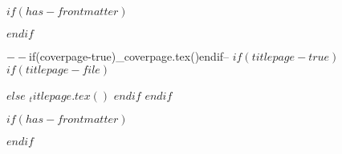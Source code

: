 
$if(has-frontmatter)$
  \begin{frontmatter}
$endif$

\begin{titlepage}
$-- %
$if(coverpage-true)$
$_coverpage.tex()$
$endif$

$-- %
$if(titlepage-true)$
$if(titlepage-file)$

$else$
$_titlepage.tex()$
$endif$
$endif$
\end{titlepage}
\setcounter{page}{1}
$if(has-frontmatter)$
\end{frontmatter}
$endif$

